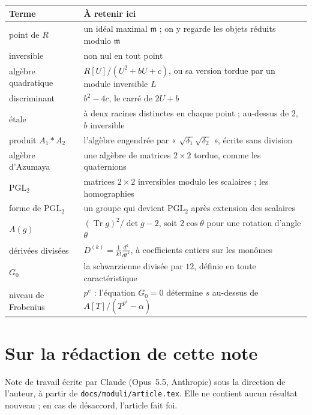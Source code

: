 \documentclass[11pt,a4paper]{amsart}
\theoremstyle{definition}
\theoremstyle{plain}
\theoremstyle{remark}
\theoremstyle{plain}
\newcommand{\PGL}{\mathrm{PGL}_2}
\newcommand{\Tr}{\operatorname{Tr}}
\begin{document}
\begin{tabular}{@{}>{\raggedright\arraybackslash}p{3.6cm}>{\raggedright\arraybackslash}p{10.2cm}@{}}
\toprule
Terme & À retenir ici \\
\midrule
point de $R$ & un idéal maximal $\mathfrak m$ ; on y regarde les objets réduits modulo $\mathfrak m$ \\
inversible & non nul en tout point \\
algèbre quadratique & $R[U]/(U^2 + bU + c)$, ou sa version tordue par un module inversible $L$ \\
discriminant & $b^2 - 4c$, le carré de $2U + b$ \\
étale & à deux racines distinctes en chaque point ; au-dessus de $2$, $b$ inversible \\
produit $A_1 * A_2$ & l'algèbre engendrée par « $\sqrt{\delta_1}\sqrt{\delta_2}$ », écrite sans division \\
algèbre d'Azumaya & une algèbre de matrices $2\times 2$ tordue, comme les quaternions \\
$\PGL$ & matrices $2\times 2$ inversibles modulo les scalaires ; les homographies \\
forme de $\PGL$ & un groupe qui devient $\PGL$ après extension des scalaires \\
$A(g)$ & $(\Tr g)^2/\det g - 2$, soit $2\cos\theta$ pour une rotation d'angle $\theta$ \\
dérivées divisées & $D^{(k)} = \frac{1}{k!}\frac{d^k}{dt^k}$, à coefficients entiers sur les monômes \\
$G_0$ & la schwarzienne divisée par $12$, définie en toute caractéristique \\
niveau de Frobenius & $p^e$ : l'équation $G_0 = 0$ détermine $s$ au-dessus de $A[T]/(T^{p^e} - \alpha)$ \\
\bottomrule
\end{tabular}

\section*{Sur la rédaction de cette note}

Note de travail écrite par Claude (Opus~5.5, Anthropic) sous la direction de l'auteur, à partir de \texttt{docs/moduli/article.tex}. Elle ne contient aucun résultat nouveau ; en cas de désaccord, l'article fait foi.
\end{document}
